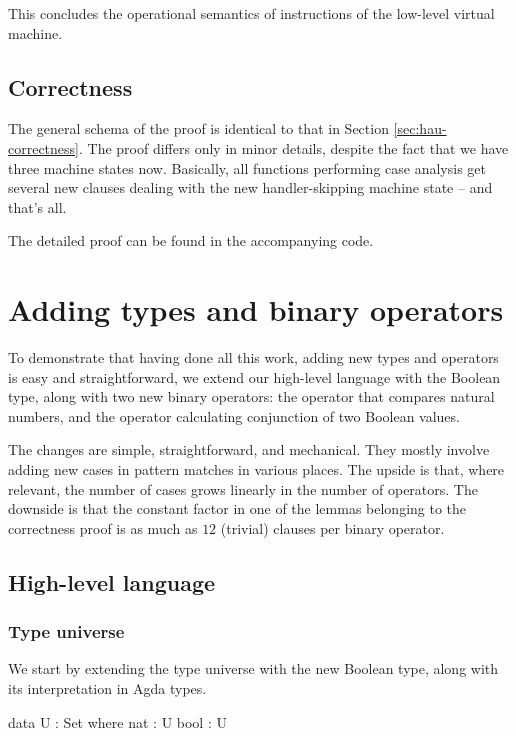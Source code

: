 This concludes the operational semantics of instructions of the low-level
virtual machine.

\subsection{Correctness}

The general schema of the proof is identical to that in Section
\ref{sec:hau-correctness}. The proof differs only in minor details, despite the
fact that we have three machine states now. Basically, all functions performing
case analysis get several new clauses dealing with the new handler-skipping
machine state -- and that's all.

The detailed proof can be found in the accompanying code.

\section{Adding types and binary operators}

To demonstrate that having done all this work, adding new types and operators
is easy and straightforward, we extend our high-level language with the Boolean type,
along with
two new binary operators: the  operator that compares natural
numbers, and the  operator calculating conjunction of two Boolean
values.

The changes are simple, straightforward, and mechanical. They mostly involve
adding new cases in pattern matches in various places. The upside is that,
where relevant, the number of cases grows linearly in the number of operators.
The downside is that the constant factor in one of the lemmas belonging to the
correctness proof is as much as $12$ (trivial) clauses per binary operator.


\subsection{High-level language}

\subsubsection{Type universe}

We start by extending the type universe with the new Boolean type, along with
its interpretation in Agda types.

\begin{code}
  data U : Set where
    nat : U
    bool : U
\end{code}

